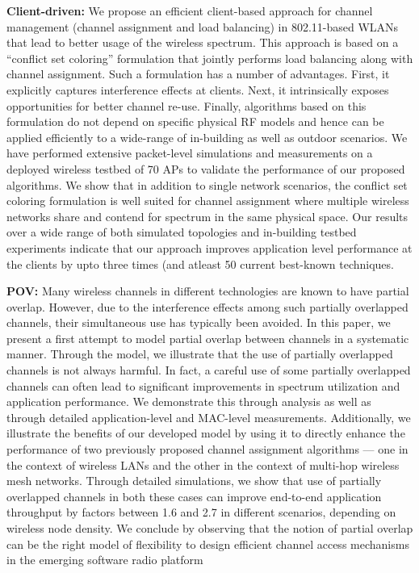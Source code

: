 \documentclass[11pt,letterpaper]{article}
\begin{document}
{\bf Client-driven:}
We propose an efficient client-based approach for
channel management (channel assignment and load balancing)
in 802.11-based WLANs that lead to better usage of the wireless
spectrum. This approach is based on a “conflict set coloring” formulation
that jointly performs load balancing along with channel
assignment. Such a formulation has a number of advantages.
First, it explicitly captures interference effects at clients. Next,
it intrinsically exposes opportunities for better channel re-use.
Finally, algorithms based on this formulation do not depend on
specific physical RF models and hence can be applied efficiently
to a wide-range of in-building as well as outdoor scenarios.
We have performed extensive packet-level simulations and
measurements on a deployed wireless testbed of 70 APs to
validate the performance of our proposed algorithms. We show
that in addition to single network scenarios, the conflict set
coloring formulation is well suited for channel assignment where
multiple wireless networks share and contend for spectrum in
the same physical space. Our results over a wide range of both
simulated topologies and in-building testbed experiments indicate
that our approach improves application level performance at the
clients by upto three times (and atleast 50%
current best-known techniques.

{\bf POV:}
Many wireless channels in different technologies are known to have
partial overlap. However, due to the interference effects among
such partially overlapped channels, their simultaneous use has typically
been avoided. In this paper, we present a first attempt to model
partial overlap between channels in a systematic manner. Through
the model, we illustrate that the use of partially overlapped channels
is not always harmful. In fact, a careful use of some partially
overlapped channels can often lead to significant improvements in
spectrum utilization and application performance. We demonstrate
this through analysis as well as through detailed application-level
and MAC-level measurements. Additionally, we illustrate the benefits
of our developed model by using it to directly enhance the
performance of two previously proposed channel assignment algorithms
— one in the context of wireless LANs and the other in the
context of multi-hop wireless mesh networks. Through detailed
simulations, we show that use of partially overlapped channels in
both these cases can improve end-to-end application throughput by
factors between 1.6 and 2.7 in different scenarios, depending on
wireless node density. We conclude by observing that the notion
of partial overlap can be the right model of flexibility to design efficient
channel access mechanisms in the emerging software radio
platform
\end{document}
